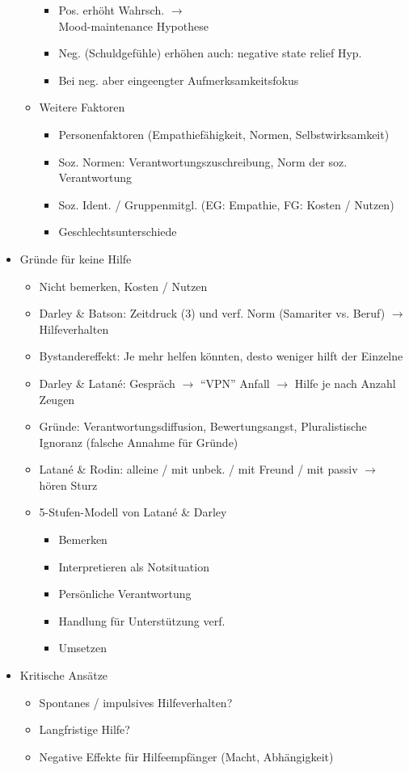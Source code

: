 \documentclass[11pt, paper=a4, twocolumn]{scrartcl}
\begin{document}
\begin{itemize}
\begin{itemize}
\begin{itemize}
							\item Pos. erhöht Wahrsch. $\rightarrow$ \\Mood-maintenance Hypothese
							\item Neg. (Schuldgefühle) erhöhen auch: negative state relief Hyp.
							\item Bei neg. aber eingeengter Aufmerksamkeitsfokus
						\end{itemize}
					\item Weitere Faktoren
						\begin{itemize}
							\item Personenfaktoren (Empathiefähigkeit, Normen, Selbstwirksamkeit)
							\item Soz. Normen: Verantwortungszuschreibung, Norm der soz. Verantwortung
							\item Soz. Ident. / Gruppenmitgl. (EG: Empathie, FG: Kosten / Nutzen)
							\item Geschlechtsunterschiede
						\end{itemize}
				\end{itemize}
			\item Gründe für keine Hilfe
				\begin{itemize}
					\item Nicht bemerken, Kosten / Nutzen
					\item Darley \& Batson: Zeitdruck (3) und verf. Norm (Samariter vs. Beruf) $\rightarrow$ Hilfeverhalten
					\item Bystandereffekt: Je mehr helfen könnten, desto weniger hilft der Einzelne
					\item Darley \& Latané: Gespräch $\rightarrow$ ``VPN'' Anfall $\rightarrow$ Hilfe je nach Anzahl Zeugen
					\item Gründe: Verantwortungsdiffusion, Bewertungsangst, Pluralistische Ignoranz (falsche Annahme für Gründe)
					\item Latané \& Rodin: alleine / mit unbek. / mit Freund / mit passiv $\rightarrow$ hören Sturz
					\item 5-Stufen-Modell von Latané \& Darley
						\begin{itemize}
							\item Bemerken
							\item Interpretieren als Notsituation
							\item Persönliche Verantwortung
							\item Handlung für Unterstützung verf.
							\item Umsetzen
						\end{itemize}
				\end{itemize}
			\item Kritische Ansätze
				\begin{itemize}
					\item Spontanes / impulsives Hilfeverhalten?
					\item Langfristige Hilfe?
					\item Negative Effekte für Hilfeempfänger (Macht, Abhängigkeit)
				\end{itemize}
		\end{itemize}
\end{document}
